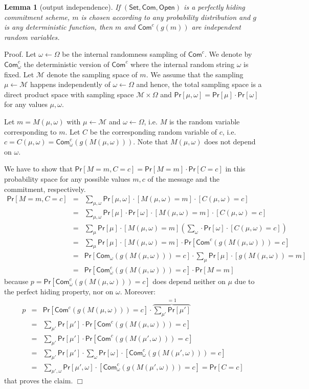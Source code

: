 \documentclass{article}
\newtheorem{lemma}{Lemma}[section]
\newenvironment{proof}{\textsf{Proof}.}{\hfill$\Box$}
\newcommand{\setup}[0]{\mathsf{Set}}
\newcommand{\commit}[0]{\mathsf{Com}}
\newcommand{\open}[0]{\mathsf{Open}}
\newcommand{\commitc}[0]{\mathsf{Com}^{c}}
\newcommand{\prob}[0]{\mathsf{Pr}} %
\begin{document}
\begin{lemma}[output independence]\label{le:outputindependence}
If $(\setup, \commit, \open)$ is a perfectly hiding commitment scheme, $m$ is chosen according to any probability distribution and $g$ is any deterministic function, then $m$ and $\commitc(g(m))$ are independent random variables.
\end{lemma}
\begin{proof}
Let $\omega \gets \Omega$ be the internal randomness sampling of $\commitc$. We denote by $\commitc_\omega$ the deterministic version of $\commitc$ where the internal random string $\omega$ is fixed. Let $\mathcal{M}$ denote the sampling space of $m$. We assume that the sampling $\mu\gets \mathcal{M}$ happens independently of $\omega \gets \Omega$ and hence, the total sampling space is a direct product space with sampling space $\mathcal{M}\times \Omega$ and $\prob[\mu,\omega]=\prob[\mu]\cdot \prob[\omega]$ for any values $\mu, \omega$.

Let $m=M(\mu,\omega)$ with $\mu\gets \mathcal{M}$ and $\omega\gets \Omega$, i.e. $M$ is the random variable corresponding to $m$. Let $C$ be the corresponding random variable of $c$, i.e. $c=C(\mu,\omega)=\commitc_\omega(g(M(\mu,\omega)))$. Note that $M(\mu,\omega)$ does not depend on $\omega$.

We have to show that $\prob[M=m,C=c] = \prob[M=m]\cdot \prob[C=c]$ in this probability space for any possible values $m,c$ of the message and the commitment, respectively.
\begin{eqnarray*}
\prob[M=m,C=c] &=& \sum_{\mu,\omega}\prob[\mu,\omega]\cdot [M(\mu,\omega)=m]\cdot [C(\mu,\omega)=c]\\
&=& \sum_{\mu,\omega}\prob[\mu]\cdot\prob[\omega]\cdot [M(\mu,\omega)=m]\cdot [C(\mu,\omega)=c]\\
&=& \sum_{\mu}\prob[\mu]\cdot[M(\mu,\omega)=m]\left(\sum_{\omega}\cdot\prob[\omega]\cdot [C(\mu,\omega)=c]\right)\\
&=& \sum_{\mu}\prob[\mu]\cdot[M(\mu,\omega)=m]\cdot
\prob[\commitc(g(M(\mu,\omega)))=c]\\
&=& \prob[\commit_\omega(g(M(\mu,\omega)))=c]\cdot \sum_{\mu}\prob[\mu]\cdot[g(M(\mu,\omega))=m]\\
&=& \prob[\commitc_\omega(g(M(\mu,\omega)))=c]\cdot \prob[M=m]
\end{eqnarray*}
because $p = \prob[\commitc_\omega(g(M(\mu,\omega)))=c]$ does depend neither on $\mu$ due to the perfect hiding property, nor on $\omega$. Moreover:
\begin{eqnarray*}
p &=& \prob[\commitc(g(M(\mu,\omega)))=c] \cdot \overbrace{\sum_{\mu'} \prob[\mu']}^{=1}\\
&=& \sum_{\mu'} \prob[\mu']\cdot \prob[\commitc(g(M(\mu,\omega)))=c]\\
&=& \sum_{\mu'} \prob[\mu']\cdot \prob[\commitc(g(M(\mu',\omega)))=c]\\
&=& \sum_{\mu'} \prob[\mu']\cdot \sum_{\omega}\prob[\omega]\cdot [\commitc_\omega(g(M(\mu',\omega)))=c]\\
&=& \sum_{\mu',\omega} \prob[\mu',\omega]\cdot [\commitc_\omega(g(M(\mu',\omega)))=c] = \prob[C=c]
\end{eqnarray*}
that proves the claim.
\end{proof}
\end{document}
